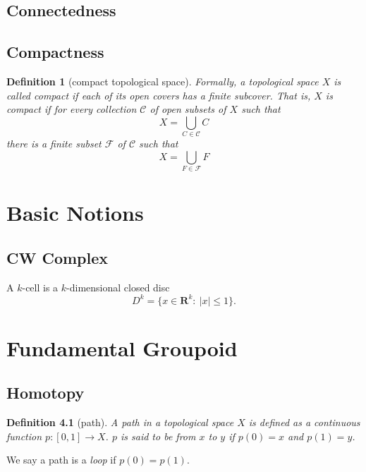 \documentclass{report}
\newtheorem{definition}{Definition}[section]
\theoremstyle{nonumberplain}
\begin{document}
\section{Connectedness}

\section{Compactness}
\begin{definition}[compact topological space]
	Formally, a topological space $X$ is called \emph{compact} if each of its open covers has a finite subcover. That is, $X$ is compact if for every collection $\mathcal{C}$ of open subsets of $X$ such that
	\[
		X=\bigcup_{C \in \mathcal{C}} C
	\]
	there is a finite subset $\mathcal{F}$ of $\mathcal{C}$ such that
	\[
		X=\bigcup_{F \in \mathcal{F}} F
	\]
\end{definition}

\chapter{Basic Notions}
\section{CW Complex}
A $k$-cell is a $k$-dimensional closed disc
\[
	D^k=\{x\in\mathbf{R}^k:\ |x|\leq 1\}.
\]

\chapter{Fundamental Groupoid}
\section{Homotopy}
\begin{definition}[path]	
	A \emph{path} in a topological space $X$ is defined as a continuous function $p:[0,1]\to X$. $p$ is said to be from $x$ to $y$ if $p(0)=x$ and $p(1)=y$.
\end{definition}
We say a path is a \emph{loop} if $p(0)=p(1)$.
\end{document}
